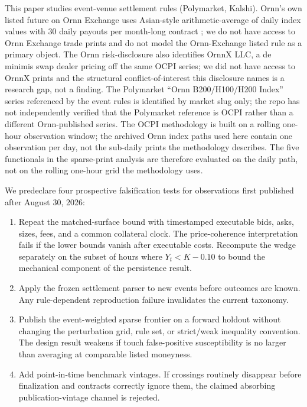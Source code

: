 \documentclass[10pt,twocolumn]{article}
\begin{document}
This paper studies event-venue settlement rules (Polymarket, Kalshi).
Ornn's own listed future on Ornn Exchange uses Asian-style arithmetic-average
of daily index values with 30 daily payouts per month-long contract
\citep{ornnfutures}; we do not have access to Ornn Exchange trade prints and
do not model the Ornn-Exchange listed rule as a primary object. The Ornn
risk-disclosure also identifies OrnnX LLC, a de minimis swap dealer pricing
off the same OCPI series; we did not have access to OrnnX prints and the
structural conflict-of-interest this disclosure names is a research gap, not
a finding. The Polymarket ``Ornn B200/H100/H200 Index'' series referenced by
the event rules is identified by market slug only; the repo has not
independently verified that the Polymarket reference is OCPI rather than a
different Ornn-published series. The OCPI methodology is built on a rolling
one-hour observation window; the archived Ornn index paths used here contain
one observation per day, not the sub-daily prints the methodology describes.
The five functionals in the sparse-print analysis are therefore evaluated on
the daily path, not on the rolling one-hour grid the methodology uses.

We predeclare four prospective falsification tests for observations first
published after August 30, 2026:
\begin{enumerate}
\item Repeat the matched-surface bound with timestamped executable bids, asks,
sizes, fees, and a common collateral clock. The price-coherence interpretation
fails if the lower bounds vanish after executable costs. Recompute the
wedge separately on the subset of hours where $Y_t < K - 0.10$ to bound the
mechanical component of the persistence result.
\item Apply the frozen settlement parser to new events before outcomes are known.
Any rule-dependent reproduction failure invalidates the current taxonomy.
\item Publish the event-weighted sparse frontier on a forward holdout without
changing the perturbation grid, rule set, or strict/weak inequality convention.
The design result weakens if touch false-positive susceptibility is no larger
than averaging at comparable listed moneyness.
\item Add point-in-time benchmark vintages. If crossings routinely disappear
before finalization and contracts correctly ignore them, the claimed absorbing
publication-vintage channel is rejected.
\end{enumerate}
\end{document}
